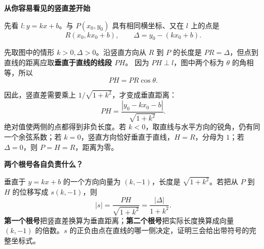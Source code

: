 \begin{explanationbox}
\textbf{\textcolor{CExplanation}{从你容易看见的竖直差开始}}

先看 $l:y=kx+b$。与 $P(x_0,y_0)$ 具有相同横坐标、又在 $l$ 上的点是
\[
 R(x_0,kx_0+b),\qquad \Delta=y_0-(kx_0+b).
\]


先取图中的情形 $k>0,\Delta>0$。沿竖直方向从 $R$ 到 $P$ 的长度是 $PR=\Delta$，但点到直线的距离应取\textbf{垂直于直线的线段 $PH$}。
因为 $PH\perp l$，图中两个标为 $\theta$ 的角相等，所以
\[
 PH=PR\cos\theta.
\]


因此，竖直差需要乘上 $1/\sqrt{1+k^2}$，才变成垂直距离：
\[
 \boxed{PH=\frac{|y_0-kx_0-b|}{\sqrt{1+k^2}}}.
\]
绝对值使两侧的点都得到非负长度。若 $k<0$，取直线与水平方向的锐角，仍有同一个余弦系数；若 $k=0$，竖直方向恰好垂直于直线，$H=R$，分母为 $1$；若 $\Delta=0$，则 $P=H=R$，距离为零。

\medskip
\textbf{\textcolor{CExplanation}{两个根号各自负责什么？}}

垂直于 $y=kx+b$ 的一个方向向量为 $(k,-1)$，长度是 $\sqrt{1+k^2}$。若把从 $P$ 到 $H$ 的位移写成 $s(k,-1)$，则
\[
 |s|=\frac{PH}{\sqrt{1+k^2}}
     =\frac{|\Delta|}{1+k^2}.
\]
\textbf{第一个根号}把竖直差换算为垂直距离；\textbf{第二个根号}把实际长度换算成向量 $(k,-1)$ 的倍数。$s$ 的正负由点在直线的哪一侧决定，证明三会给出带符号的完整坐标式。
\end{explanationbox}

